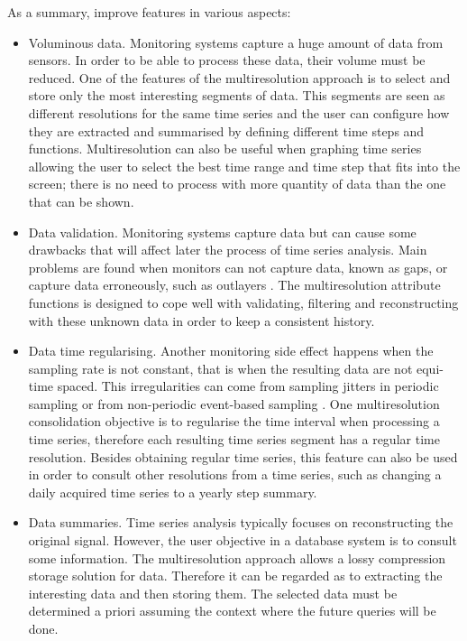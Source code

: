 As a summary,  improve  features in various aspects:
\begin{itemize}

\item Voluminous data. Monitoring systems capture a huge amount of
  data from sensors. In order to be able to process these data,
  their volume must be reduced. One of the features of the
  multiresolution approach is to select and store only the most
  interesting segments of data. This segments are seen as different
  resolutions for the same time series and the user can configure how
  they are extracted and summarised by defining different time steps
  and functions. Multiresolution can also be useful when graphing time
  series allowing the user to select the best time range and time
  step that fits into the screen; there is no need to process with
  more quantity of data than the one that can be
  shown.

\item Data validation. Monitoring systems capture data but can cause
  some drawbacks that will affect later the process of time series
  analysis. Main problems are found when monitors can not capture
  data, known as gaps, or capture data erroneously, such as outlayers
  \cite{quevedo10}.  The multiresolution attribute functions is
  designed to cope well with validating, filtering and reconstructing
  with these unknown data in order to keep a consistent
  history.

\item Data time regularising. Another monitoring side effect happens
  when the sampling rate is not constant, that is when the resulting
  data are not equi-time spaced. This irregularities can come from
  sampling jitters in periodic sampling or from non-periodic
  event-based sampling \cite{kopetz11:realtime}. One multiresolution
  consolidation objective is to regularise the time interval when
  processing a time series, therefore each resulting time series
  segment has a regular time resolution. Besides obtaining regular
  time series, this feature can also be used in order to consult other
  resolutions from a time series, such as changing a daily acquired
  time series to a yearly step summary.


\item Data summaries. Time series analysis typically focuses on
  reconstructing the original signal. However, the user objective in a
  database system is to consult some information. The multiresolution
  approach allows a lossy compression storage solution for data. Therefore
  it can be regarded as to extracting the interesting data and
  then storing them. The selected data must be determined a
  priori assuming the context where the future queries will be done.
\end{itemize}


